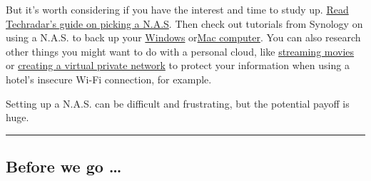 But it's worth considering if you have the interest and time to study
up.
\href{https://www.techradar.com/news/the-10-best-nas-devices-reviewed}{Read
Techradar's guide on picking a N.A.S}. Then check out tutorials from
Synology on using a N.A.S. to back up your
\href{https://www.synology.com/en-global/knowledgebase/DSM/tutorial/Backup/How_to_back_up_data_from_Windows_computer_to_Synology_NAS_using_Windows_or_3rd_party_applications}{Windows}
or\href{https://www.synology.com/en-us/knowledgebase/DSM/tutorial/Backup/How_to_back_up_files_from_Mac_to_Synology_NAS_with_Time_Machine}{Mac
computer}. You can also research other things you might want to do with
a personal cloud, like
\href{https://www.nytimes3xbfgragh.onion/2020/01/15/technology/personaltech/streaming-media-home-server.html}{streaming
movies} or
\href{https://www.synology.com/en-us/knowledgebase/DSM/help/VPNCenter/vpn_setup}{creating
a virtual private network} to protect your information when using a
hotel's insecure Wi-Fi connection, for example.

Setting up a N.A.S. can be difficult and frustrating, but the potential
payoff is huge.

\begin{center}\rule{0.5\linewidth}{\linethickness}\end{center}

\hypertarget{before-we-go-}{%
\subsection{Before we go \ldots{}}\label{before-we-go-}}


